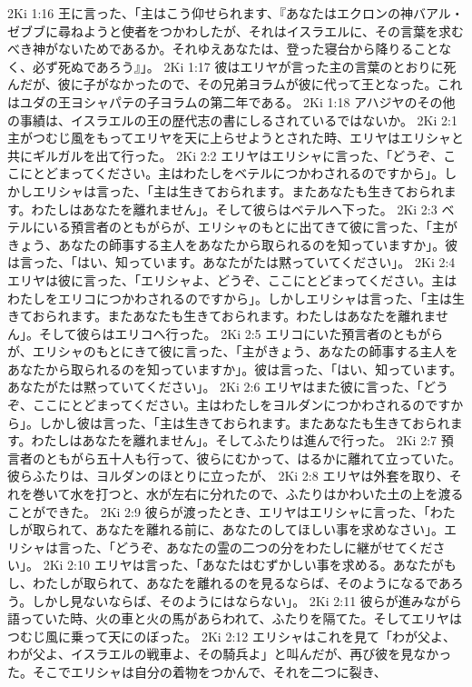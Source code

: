 2Ki 1:16  王に言った、「主はこう仰せられます、『あなたはエクロンの神バアル・ゼブブに尋ねようと使者をつかわしたが、それはイスラエルに、その言葉を求むべき神がないためであるか。それゆえあなたは、登った寝台から降りることなく、必ず死ぬであろう』」。
2Ki 1:17  彼はエリヤが言った主の言葉のとおりに死んだが、彼に子がなかったので、その兄弟ヨラムが彼に代って王となった。これはユダの王ヨシャパテの子ヨラムの第二年である。
2Ki 1:18  アハジヤのその他の事績は、イスラエルの王の歴代志の書にしるされているではないか。
2Ki 2:1  主がつむじ風をもってエリヤを天に上らせようとされた時、エリヤはエリシャと共にギルガルを出て行った。
2Ki 2:2  エリヤはエリシャに言った、「どうぞ、ここにとどまってください。主はわたしをベテルにつかわされるのですから」。しかしエリシャは言った、「主は生きておられます。またあなたも生きておられます。わたしはあなたを離れません」。そして彼らはベテルへ下った。
2Ki 2:3  ベテルにいる預言者のともがらが、エリシャのもとに出てきて彼に言った、「主がきょう、あなたの師事する主人をあなたから取られるのを知っていますか」。彼は言った、「はい、知っています。あなたがたは黙っていてください」。
2Ki 2:4  エリヤは彼に言った、「エリシャよ、どうぞ、ここにとどまってください。主はわたしをエリコにつかわされるのですから」。しかしエリシャは言った、「主は生きておられます。またあなたも生きておられます。わたしはあなたを離れません」。そして彼らはエリコへ行った。
2Ki 2:5  エリコにいた預言者のともがらが、エリシャのもとにきて彼に言った、「主がきょう、あなたの師事する主人をあなたから取られるのを知っていますか」。彼は言った、「はい、知っています。あなたがたは黙っていてください」。
2Ki 2:6  エリヤはまた彼に言った、「どうぞ、ここにとどまってください。主はわたしをヨルダンにつかわされるのですから」。しかし彼は言った、「主は生きておられます。またあなたも生きておられます。わたしはあなたを離れません」。そしてふたりは進んで行った。
2Ki 2:7  預言者のともがら五十人も行って、彼らにむかって、はるかに離れて立っていた。彼らふたりは、ヨルダンのほとりに立ったが、
2Ki 2:8  エリヤは外套を取り、それを巻いて水を打つと、水が左右に分れたので、ふたりはかわいた土の上を渡ることができた。
2Ki 2:9  彼らが渡ったとき、エリヤはエリシャに言った、「わたしが取られて、あなたを離れる前に、あなたのしてほしい事を求めなさい」。エリシャは言った、「どうぞ、あなたの霊の二つの分をわたしに継がせてください」。
2Ki 2:10  エリヤは言った、「あなたはむずかしい事を求める。あなたがもし、わたしが取られて、あなたを離れるのを見るならば、そのようになるであろう。しかし見ないならば、そのようにはならない」。
2Ki 2:11  彼らが進みながら語っていた時、火の車と火の馬があらわれて、ふたりを隔てた。そしてエリヤはつむじ風に乗って天にのぼった。
2Ki 2:12  エリシャはこれを見て「わが父よ、わが父よ、イスラエルの戦車よ、その騎兵よ」と叫んだが、再び彼を見なかった。そこでエリシャは自分の着物をつかんで、それを二つに裂き、
